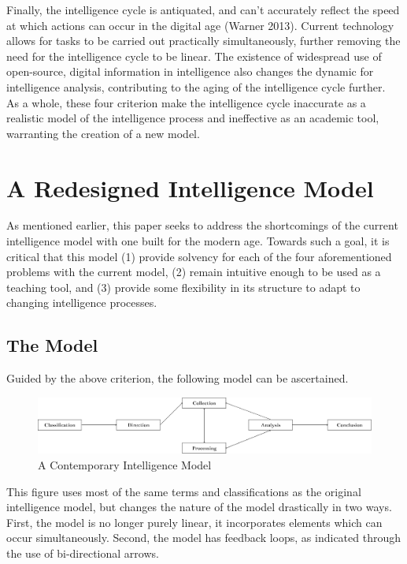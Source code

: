 \documentclass[10pt, letterpaper]{article}
\begin{document}
Finally, the intelligence cycle is antiquated, and can't accurately reflect the speed at which actions can occur in the digital age (Warner 2013). Current technology allows for tasks to be carried out practically simultaneously, further removing the need for the intelligence cycle to be linear. The existence of widespread use of open-source, digital information in intelligence also changes the dynamic for intelligence analysis, contributing to the aging of the intelligence cycle further. \\ 

As a whole, these four criterion make the intelligence cycle inaccurate as a realistic model of the intelligence process and ineffective as an academic tool, warranting the creation of a new model. 

\newpage \section{A Redesigned Intelligence Model}
As mentioned earlier, this paper seeks to address the shortcomings of the current intelligence model with one built for the modern age. Towards such a goal, it is critical that this model (1) provide solvency for each of the four aforementioned problems with the current model, (2) remain intuitive enough to be used as a teaching tool, and (3) provide some flexibility in its structure to adapt to changing intelligence processes.

\subsection{The Model}
Guided by the above criterion, the following model can be ascertained. \\

\begin{figure} [h!]
    \centering
    \includegraphics[scale = 0.3]{Model1.pdf} 
    \caption{A Contemporary Intelligence Model}
    \label{A Contemporary Intelligence Model}
\end{figure}

This figure uses most of the same terms and classifications as the original intelligence model, but changes the nature of the model drastically in two ways. First, the model is no longer purely linear, it incorporates elements which can occur simultaneously. Second, the model has feedback loops, as indicated through the use of bi-directional arrows. \\
\end{document}

